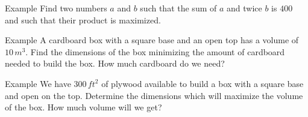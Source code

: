 \documentclass[t]{beamer}
\begin{document}
\begin{frame}{Example}
Find two numbers $a$ and $b$ such that the sum of $a$ and twice $b$ is $400$ and such that their product is maximized.
\end{frame}

\begin{frame}{Example}
A cardboard box with a square base and an open top has a volume of 
$10 \, m^3$. Find the dimensions of the box minimizing the amount of
cardboard needed to build the box.  How much cardboard do we need?
\end{frame}

\begin{frame}{Example}
We have $300 \, ft^2$ of plywood available to build a box with a 
square base and open on the top.  Determine the dimensions which will
maximize the volume of the box.  How much volume will we get?
\end{frame}
\end{document}
